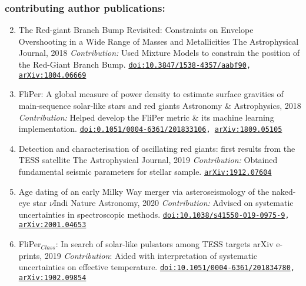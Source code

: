 \documentclass[letterpaper]{k-cv} %
\begin{document}
\subsubsection*{\color{c2}contributing author publications:}
\begin{enumerate}
	\setcounter{enumi}{1}
	\item {}
	{The Red-giant Branch Bump Revisited: Constraints on Envelope Overshooting in a Wide Range of Masses and Metallicities}
	{The Astrophysical Journal, 2018}
	{\textit{Contribution:} Used Mixture Models to constrain the position of the Red-Giant Branch Bump.}
	{\texttt{\href{https://iopscience.iop.org/article/10.3847/1538-4357/aabf90}{doi:10.3847/1538-4357/aabf90}, \href{https://arxiv.org/abs/1804.06669}{arXiv:1804.06669}}}

	\item {}
	{FliPer: A global measure of power density to estimate surface gravities of main-sequence solar-like stars and red giants}
	{Astronomy \& Astrophysics, 2018}
	{\textit{Contribution:} Helped develop the FliPer metric \& its machine learning implementation.}
	{\texttt{\href{https://www.aanda.org/articles/aa/abs/2018/12/aa33106-18/aa33106-18.html}{doi:0.1051/0004-6361/201833106}, \href{https://arxiv.org/abs/1809.05105}{arXiv:1809.05105}}}
	
	\item {}
	{Detection and characterisation of oscillating red giants: first results from the TESS satellite}
	{The Astrophysical Journal, 2019}
	{\bodyfont \textit{Contribution:} Obtained fundamental seismic parameters for stellar sample.}
	{\texttt{\href{https://arxiv.org/abs/1912.07604}{arXiv:1912.07604}}}
		
	\item {}
	{Age dating of an early Milky Way merger via asteroseismology of the naked-eye star $\nu$Indi}
	{Nature Astronomy, 2020}
	{\bodyfont \textit{Contribution:} Advised on systematic uncertainties in spectroscopic methods.}
	{\texttt{\href{https://www.nature.com/articles/s41550-019-0975-9}{doi:10.1038/s41550-019-0975-9}, \href{https://arxiv.org/abs/2001.04653}{arXiv:2001.04653}}}
%	
	\item {}
	{FliPer$_{Class}$: In search of solar-like pulsators among TESS targets}
	{arXiv e-prints, 2019}
	{\textit{Contribution}: Aided with interpretation of systematic uncertainties on effective temperature.}	
	{\texttt{\href{https://www.aanda.org/articles/aa/abs/2019/04/aa34780-18/aa34780-18.html}{doi:10.1051/0004-6361/201834780}, \href{https://arxiv.org/abs/1902.09854}{arXiv:1902.09854}}}
	

\end{enumerate}
\end{document}

